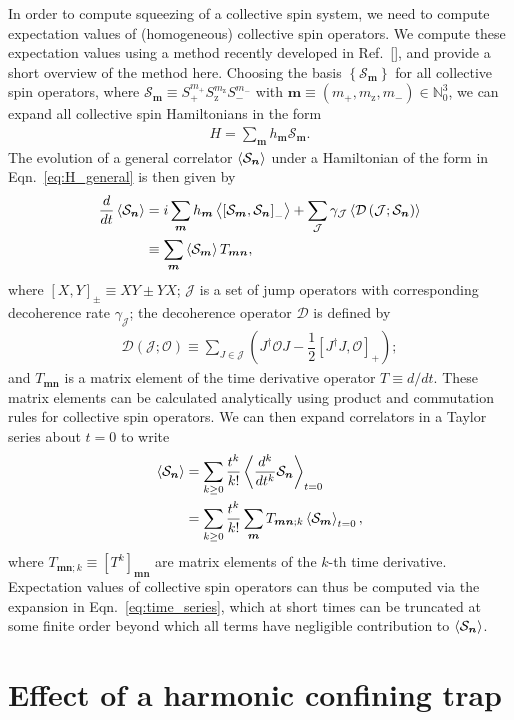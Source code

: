 \documentclass[aps,prx,superscriptaddress,notitlepage,twocolumn,longbibliography]{revtex4-1}
\newcommand{\f}[2]{\dfrac{#1}{#2}} %
\newcommand{\p}[1]{\left(#1\right)} %
\renewcommand{\sp}[1]{\left[#1\right]} %
\renewcommand{\set}[1]{\left\{#1\right\}} %
\renewcommand{\v}{\bm} %
\newcommand{\bk}{\Braket}
\newcommand{\J}{\mathcal{J}}
\renewcommand{\O}{\mathcal{O}}
\renewcommand{\S}{\mathcal{S}}
\newcommand{\z}{\text{z}}
\begin{document}
In order to compute squeezing of a collective spin system, we need to compute expectation values of (homogeneous) collective spin operators.
We compute these expectation values using a method recently developed in Ref.~[], and provide a short overview of the method here.
Choosing the basis $\set{\S_{\v m}}$ for all collective spin operators, where $\S_{\v m}\equiv S_+^{m_+} S_\z^{m_\z} S_-^{m_-}$ with
$\v m\equiv\p{m_+,m_\z,m_-}\in\mathbb{N}_0^3$, we can expand all
collective spin Hamiltonians in the form
\begin{align}
  H = \sum_{\v m} h_{\v m} \S_{\v m}.
  \label{eq:H_general}
\end{align}
The evolution of a general correlator $\bk{\S_{\v n}}$ under a Hamiltonian of the form in Eqn.~\eqref{eq:H_general} is then given by
\begin{align}
  \f{d}{dt} \bk{\S_{\v n}}
  &= i \sum_{\v m} h_{\v m}
  \bk{\sp{\S_{\v m}, \S_{\v n}}_-}
  + \sum_\J \gamma_\J \bk{\mathcal D\p{\J; \S_{\v n}}} \notag \\
  &\equiv \sum_{\v m} \bk{\S_{\v m}} T_{\v m\v n},
\end{align}
where $\sp{X,Y}_\pm\equiv XY\pm YX$; $\J$ is a set of jump operators with corresponding decoherence rate $\gamma_\J$; the decoherence operator $\mathcal D$ is defined by
\begin{align}
  \mathcal{D}\p{\J;\O}
  \equiv \sum_{J\in\J}\p{J^\dag \O J - \f12\sp{J^\dag J,\O}_+};
\end{align}
and $T_{\v m\v n}$ is a matrix element of the time derivative operator $T\equiv d/dt$.
These matrix elements can be calculated analytically using product and commutation rules for collective spin operators.
We can then expand correlators in a Taylor series about $t=0$ to write
\begin{align}
  \bk{\S_{\v n}}
  &= \sum_{k\ge0} \f{t^k}{k!} \bk{\f{d^k}{dt^k} \S_{\v n}}_{t=0}
  \notag \\
  &= \sum_{k\ge0} \f{t^k}{k!}
  \sum_{\v m} T_{\v m\v n;k} \bk{\S_{\v m}}_{t=0},
  \label{eq:time_series}
\end{align}
where $T_{\v m\v n;k}\equiv\sp{T^k}_{\v m\v n}$ are matrix elements of the $k$-th time derivative.
Expectation values of collective spin operators can thus be computed via the expansion in Eqn.~\eqref{eq:time_series}, which at short times can be truncated at some finite order beyond which all terms have negligible contribution to $\bk{\S_{\v n}}$.

\section{ Effect of a harmonic confining trap}
\label{App:harmonic_trap}
\setcounter{figure}{0}
\end{document}
